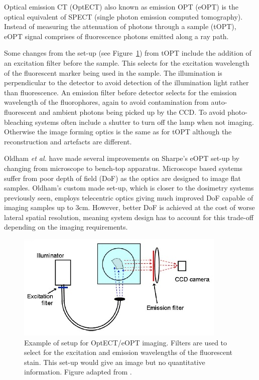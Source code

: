 \documentclass[12pt]{article}
\begin{document}
Optical emission CT (OptECT) also known as emission OPT (eOPT) is the optical equivalent of SPECT (single photon emission computed tomography). \cite{Oldham:2007ku}  Instead of measuring the attenuation of photons through a sample (tOPT), eOPT signal comprises of fluorescence photons emitted along a ray path. \cite{Walls:2005ja}

Some changes from the set-up (see Figure~\ref{fig:eOPTsetup}) from tOPT  include the addition of an excitation filter before the sample. This selects for the excitation wavelength of the fluorescent marker being used in the sample. The illumination is perpendicular to the detector to avoid detection of the illumination light rather than fluorescence. An emission filter before detector selects for the emission wavelength of the fluorophores, again to avoid contamination from auto-fluorescent and ambient photons being picked up by the CCD. To avoid photo-bleaching systems often include a shutter to turn off the lamp when not imaging.  Otherwise the image forming optics is the same as for tOPT although the reconstruction and artefacts are different. \cite{Walls:2005ja}


Oldham \textit{et al.} have made several improvements  on Sharpe's eOPT set-up by changing from microscope to bench-top apparatus.\cite{Oldham:2006, Oldham:2007ku} Microscope based systems suffer from poor depth of field (DoF) as the optics are designed to image flat samples.  Oldham's custom made set-up, which is closer to the dosimetry systems previously seen, employs telecentric optics giving much improved DoF capable of imaging samples up to 3cm. \cite{Oldham:2007ku} However, better DoF is achieved at the cost of worse lateral spatial resolution, meaning system design has to account for this trade-off depending on the imaging requirements. \cite{Krstajic:2006kna}    


\begin{figure}[H]
\centering
\includegraphics[scale=1]{Oldham_2007ku_eCTsetup.jpg}
\caption{Example of setup for OptECT/eOPT imaging. Filters are used to select for the excitation and emission wavelengths of the fluorescent stain. This set-up would give an image but no quantitative information. Figure adapted from \cite{Oldham:2007ku}.}
\label{fig:eOPTsetup}
\end{figure}
\end{document}

